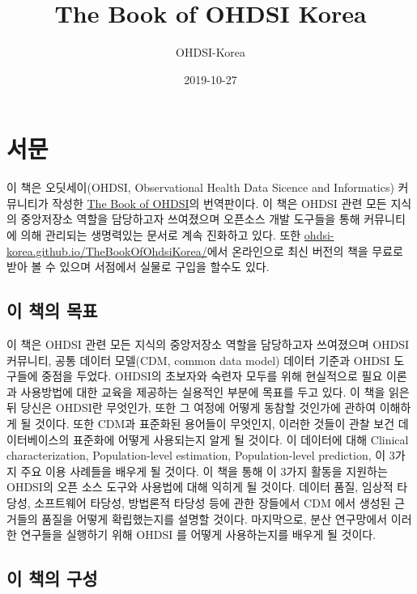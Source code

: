 \documentclass[11pt]{book}
\title{The Book of OHDSI Korea}
\author{OHDSI-Korea}
\date{2019-10-27}
\theoremstyle{definition}
\theoremstyle{definition}
\theoremstyle{definition}
\theoremstyle{remark}
\begin{document}
\maketitle

{
\setcounter{tocdepth}{1}
\tableofcontents
}
\chapter*{서문}

 이 책은 오딧세이(OHDSI, Observational Health Data Sicence and
Informatics) 커뮤니티가 작성한 \href{book.ohdsi.org}{The Book of
OHDSI}의 번역판이다. 이 책은 OHDSI 관련 모든 지식의 중앙저장소 역할을
담당하고자 쓰여졌으며 오픈소스 개발 도구들을 통해 커뮤니티에 의해
관리되는 생명력있는 문서로 계속 진화하고 있다. 또한
\href{https://ohdsi-korea.github.io/TheBookOfOhdsiKorea/}{ohdsi-korea.github.io/TheBookOfOhdsiKorea/}에서
온라인으로 최신 버전의 책을 무료로 받아 볼 수 있으며 서점에서 실물로
구입을 할수도 있다.

\section*{이 책의 목표}\label{--}

이 책은 OHDSI 관련 모든 지식의 중앙저장소 역할을 담당하고자 쓰여졌으며
OHDSI 커뮤니티, 공통 데이터 모델(CDM, common data model) 데이터 기준과
OHDSI 도구들에 중점을 두었다. OHDSI의 초보자와 숙련자 모두를 위해
현실적으로 필요 이론과 사용방법에 대한 교육을 제공하는 실용적인 부분에
목표를 두고 있다. 이 책을 읽은 뒤 당신은 OHDSI란 무엇인가, 또한 그
여정에 어떻게 동참할 것인가에 관하여 이해하게 될 것이다. 또한 CDM과
표준화된 용어들이 무엇인지, 이러한 것들이 관찰 보건 데이터베이스의
표준화에 어떻게 사용되는지 알게 될 것이다. 이 데이터에 대해 Clinical
characterization, Population-level estimation, Population-level
prediction, 이 3가지 주요 이용 사례들을 배우게 될 것이다. 이 책을 통해
이 3가지 활동을 지원하는 OHDSI의 오픈 소스 도구와 사용법에 대해 익히게
될 것이다. 데이터 품질, 임상적 타당성, 소프트웨어 타당성, 방법론적
타당성 등에 관한 장들에서 CDM 에서 생성된 근거들의 품질을 어떻게
확립했는지를 설명할 것이다. 마지막으로, 분산 연구망에서 이러한 연구들을
실행하기 위해 OHDSI 를 어떻게 사용하는지를 배우게 될 것이다.

\section*{이 책의 구성}\label{--}
\end{document}
